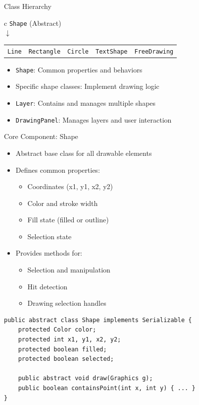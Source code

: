 \documentclass{beamer}
\begin{document}
\begin{frame}{Class Hierarchy}
\begin{center}
\begin{tabular}{c}
\texttt{Shape} (Abstract) \\
$\downarrow$ \\
\begin{tabular}{ccccc}
\texttt{Line} & \texttt{Rectangle} & \texttt{Circle} & \texttt{TextShape} & \texttt{FreeDrawing} \\
\end{tabular}
\end{tabular}
\end{center}

\vspace{0.5cm}
\begin{itemize}
\item \texttt{Shape}: Common properties and behaviors
\item Specific shape classes: Implement drawing logic
\item \texttt{Layer}: Contains and manages multiple shapes
\item \texttt{DrawingPanel}: Manages layers and user interaction
\end{itemize}
\end{frame}

\begin{frame}[fragile]{Core Component: Shape}
\begin{itemize}
\item Abstract base class for all drawable elements
\item Defines common properties:
  \begin{itemize}
  \item Coordinates (x1, y1, x2, y2)
  \item Color and stroke width
  \item Fill state (filled or outline)
  \item Selection state
  \end{itemize}
\item Provides methods for:
  \begin{itemize}
  \item Selection and manipulation
  \item Hit detection
  \item Drawing selection handles
  \end{itemize}
\end{itemize}

\begin{verbatim}
public abstract class Shape implements Serializable {
    protected Color color;
    protected int x1, y1, x2, y2;
    protected boolean filled;
    protected boolean selected;
    
    public abstract void draw(Graphics g);
    public boolean containsPoint(int x, int y) { ... }
}
\end{verbatim}
\end{frame}
\end{document}

